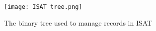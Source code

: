 \begin{figure}[htbp]
	\centering
	\texttt{[image: ISAT tree.png]}
	\caption{The binary tree used to manage records in ISAT}
	\label{ISAT_tree}
\end{figure}


